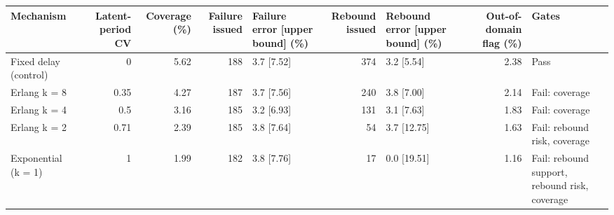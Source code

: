 \begin{tabular}{lrrrlrlrl}
\toprule
Mechanism & Latent-period CV & Coverage (\%) & Failure issued & Failure error [upper bound] (\%) & Rebound issued & Rebound error [upper bound] (\%) & Out-of-domain flag (\%) & Gates \\
\midrule
Fixed delay (control) & 0 & 5.62 & 188 & 3.7 [7.52] & 374 & 3.2 [5.54] & 2.38 & Pass \\
Erlang k = 8 & 0.35 & 4.27 & 187 & 3.7 [7.56] & 240 & 3.8 [7.00] & 2.14 & Fail: coverage \\
Erlang k = 4 & 0.5 & 3.16 & 185 & 3.2 [6.93] & 131 & 3.1 [7.63] & 1.83 & Fail: coverage \\
Erlang k = 2 & 0.71 & 2.39 & 185 & 3.8 [7.64] & 54 & 3.7 [12.75] & 1.63 & Fail: rebound risk, coverage \\
Exponential (k = 1) & 1 & 1.99 & 182 & 3.8 [7.76] & 17 & 0.0 [19.51] & 1.16 & Fail: rebound support, rebound risk, coverage \\
\bottomrule
\end{tabular}
